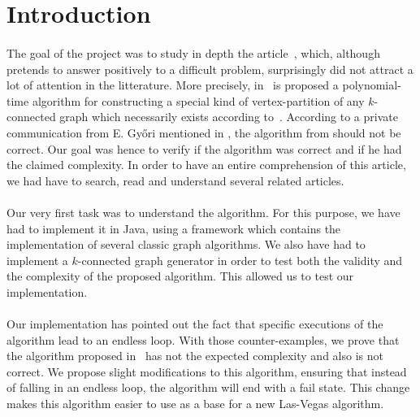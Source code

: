 \section{Introduction}
\paragraph{}
The goal of the project was to study in depth the article~\cite{JS94}, which,
although pretends to answer positively to a difficult problem,
surprisingly did not attract a lot of attention in the litterature.
More precisely, in~\cite{JS94} is proposed a polynomial-time algorithm for
constructing a special kind of vertex-partition of any $k$-connected graph
which necessarily exists according to~\cite{GE78,LL77}.
According to  a private communication from E. Gy{\H o}ri mentioned in
\cite{Nakano1997315}, the algorithm from \cite{JS94} should not be correct.
Our goal was hence to verify if the algorithm was correct and if he had the
claimed complexity.
In order to have an entire comprehension of this article, we had have to
search, read and understand several related articles.


\paragraph{}
Our very first task was to understand the algorithm. For this purpose, we have 
had to implement it in Java, using a framework which contains the implementation
of several classic graph algorithms.
We also have had to implement a $k$-connected graph generator in order to test both
the validity and the complexity of the proposed algorithm. This allowed
us to test our implementation.

\paragraph{}
Our implementation has pointed out the fact that specific executions of the
algorithm lead to an endless loop. With those counter-examples, we
prove that the algorithm proposed in~\cite{JS94} has not the expected
complexity and also is not correct.
We propose slight modifications to this algorithm, ensuring that instead of
falling in an endless loop, the algorithm will end with a fail state. This
change makes this algorithm easier to use as a base for a new Las-Vegas
algorithm.
